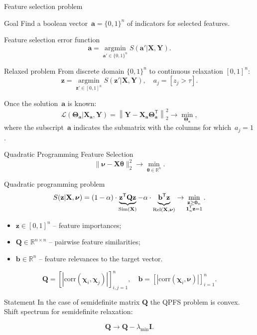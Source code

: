 \documentclass[9pt]{beamer}
\newcommand{\bz}{\mathbf{z}}
\newcommand{\ba}{\mathbf{a}}
\newcommand{\bb}{\mathbf{b}}
\newcommand{\bY}{\mathbf{Y}}
\newcommand{\bX}{\mathbf{X}}
\newcommand{\bQ}{\mathbf{Q}}
\newcommand{\bbR}{\mathbb{R}}
\newcommand{\bchi}{\boldsymbol{\chi}}
\newcommand{\bnu}{\boldsymbol{\nu}}
\newcommand{\bOne}{\boldsymbol{1}}
\newcommand{\bZero}{\boldsymbol{0}}
\newcommand{\btheta}{\boldsymbol{\theta}}
\newcommand{\bTheta}{\boldsymbol{\Theta}}
\newcommand{\argmin}{\mathop{\arg \min}\limits}
\newcommand{\T}{\mathsf{T}}
\begin{document}
\begin{frame}{Feature selection problem}
\begin{block}{Goal}
Find a boolean vector~$\ba = \{0, 1\}^n$ of indicators for selected features. 
\end{block}
\begin{block}{Feature selection error function}
	\vspace{-0.2cm}
\[
\ba = \argmin_{\ba' \in \{0, 1\}^n} S(\ba' | \bX, \bY).
\]
\vspace{-0.5cm}
\end{block}
\begin{block}{Relaxed problem}
	From discrete domain $\{0, 1\}^n$ to continuous relaxation $[0, 1]^n$:
	\[
	\bz = \argmin_{\bz' \in [0, 1]^n} S(\bz' | \bX, \bY), \quad 
	a_j = [z_j > \tau].
\]
\end{block}
Once the solution~$\ba$ is known:
\[
\mathcal{L}(\bTheta_{\ba} | \bX_{\ba}, \bY) = {\left\| \mathbf{Y} - \bX_{\ba}\bTheta^{\T}_{\ba} \right\| }_2^2 \rightarrow\min_{\bTheta_{\ba}},
\]
where the subscript~$\ba$ indicates the submatrix with the columns for which~$a_j = 1$.
\end{frame}
\begin{frame}{Quadratic Programming Feature Selection}
	\[
	\| \bnu - \bX \btheta\|_2^2 \rightarrow\min_{\btheta \in \bbR^{n}}.
	\]
	\vspace{-0.3cm}
	\begin{block}{Quadratic programming problem}
	\vspace{-0.3cm}
	\[
	S(\bz | \bX, \bnu)	= (1 - \alpha) \cdot \underbrace{\bz^{\T} \bQ \bz}_{\text{Sim}(\bX)} - \alpha \cdot \underbrace{\vphantom{()} \mathbf{b}^{\T} \bz}_{\text{Rel}(\bX, \bnu)} \rightarrow \min_{\substack{\bz \geq \bZero_n \\ \bOne_n^{\T} \bz=1}}.
	\]
	\end{block}
		\begin{itemize}
			\item $\bz \in [0, 1]^n$ -- feature importances;
			\item $\bQ \in \bbR^{n \times n}$ -- pairwise feature similarities;
			\item $\mathbf{b} \in \bbR^n$ -- feature relevances to the target vector.
		\end{itemize}
		\[
		\bQ = \left[\left|\text{corr}(\bchi_i, \bchi_j)\right|\right]_{i,j=1}^n, \quad
		\bb = \left[\left|\text{corr}(\bchi_i, \bnu)\right|\right]_{i=1}^n.
		\]
\vspace{-0.2cm}
\begin{block}{Statement}
	In the case of semidefinite matrix $\bQ$ the QPFS problem is convex. Shift spectrum for semidefinite relaxation:
\end{block}
\begin{equation*}
\bQ \rightarrow \bQ - \lambda_{\min} \mathbf{I}.
\end{equation*}
\end{frame}
\end{document}
